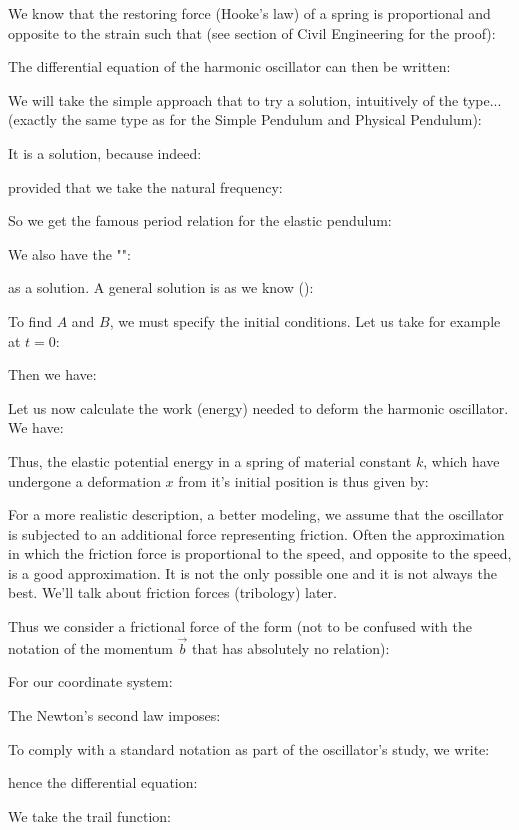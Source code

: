 	We know that the restoring force (Hooke's law) of a spring is proportional and opposite to the strain such that (see section of Civil Engineering for the proof):
	
	The differential equation of the harmonic oscillator can then be written:
	
	We will take the simple approach that to try a solution, intuitively of the type... (exactly the same type as for the Simple Pendulum and Physical Pendulum):
	
	It is a solution, because indeed:
	
	provided that we take the natural frequency:
	
	So we get the famous period relation for the elastic pendulum:
	
	We also have the "":
	
	as a solution.
	A general solution is as we know ():
	
	To find $A$ and $B$, we must specify the initial conditions. Let us take for example at $t=0$:
	
	Then we have:
	
	Let us now calculate the work (energy) needed to deform the harmonic oscillator. We have:
	
	Thus, the elastic potential energy in a spring of material constant $k$, which have undergone a deformation $x$ from it's initial position is thus given by:
	
	For a more realistic description, a better modeling, we assume that the oscillator is subjected to an additional force representing friction. Often the approximation in which the friction force is proportional to the speed, and opposite to the speed, is a good approximation. It is not the only possible one and it is not always the best. We'll talk about friction forces (tribology) later.

	Thus we consider a frictional force of the form (not to be confused with the notation of the momentum $\vec{b}$ that has absolutely no relation):
	
	For our coordinate system:
	
	The Newton's second law imposes:
	
	To comply with a standard notation as part of the oscillator's study, we write:
	
	hence the differential equation:
	
	We take the trail function:
	
